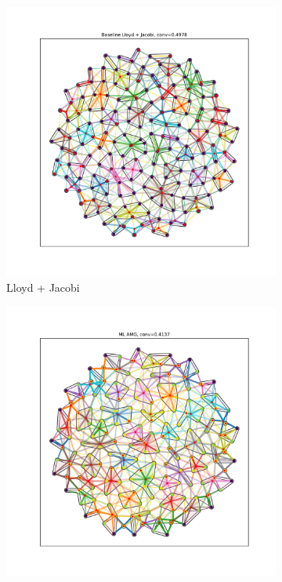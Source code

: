 \documentclass{article}
\begin{document}
\begin{figure}[h]
  \centering
  \begin{subfigure}[t]{0.32\textwidth}
    \centering
    \includegraphics[width=\textwidth, trim=80 70 70 50, clip]{grid_circle_lloyd.pdf}
    \caption{Lloyd + Jacobi}
  \end{subfigure}
  \begin{subfigure}[t]{0.32\textwidth}
    \centering
    \includegraphics[width=\textwidth, trim=80 70 70 50, clip]{grid_circle_ml.pdf}

\end{subfigure}
\end{figure}
\end{document}
